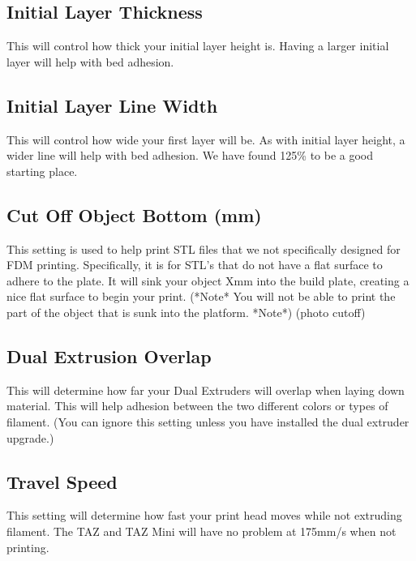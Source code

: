 \subsection{Initial Layer Thickness}

This will control how thick your initial layer height is. Having a larger initial layer will help with bed adhesion.

\subsection{Initial Layer Line Width}

This will control how wide your first layer will be. As with initial layer height, a wider line will help with bed adhesion. We have found 125\% to be a good starting place.

\subsection{Cut Off Object Bottom (mm)}

This setting is used to help print STL files that we not specifically designed for FDM printing. Specifically, it is for STL's that do not have a flat surface to adhere to the plate. It will sink your object Xmm into the build plate, creating a nice flat surface to begin your print. (*Note* You will not be able to print the part of the object that is sunk into the platform. *Note*) (photo cutoff)

\subsection{Dual Extrusion Overlap}

This will determine how far your Dual Extruders will overlap when laying down material. This will help adhesion between the two different colors or types of filament. (You can ignore this setting unless you have installed the dual extruder upgrade.)

\subsection{Travel Speed}

This setting will determine how fast your print head moves while not extruding filament. The TAZ and TAZ Mini will have no problem at 175mm/s when not printing.

